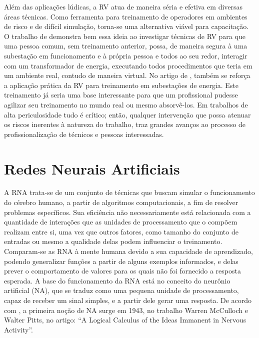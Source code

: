 Além das aplicações lúdicas, a RV atua de maneira séria e efetiva em diversas áreas técnicas. Como ferramenta para treinamento de operadores em ambientes de risco e de difícil simulação, torna-se uma alternativa viável para capacitação.  O trabalho de  demonstra bem essa ideia ao investigar técnicas de RV para que uma pessoa comum, sem treinamento anterior, possa, de maneira segura à uma subestação em funcionamento e à própria pessoa e todos ao seu redor, interagir com um transformador de energia, executando todos procedimentos que teria em um ambiente real, contudo de maneira virtual. No artigo de , também se reforça a aplicação prática da RV para treinamento em subestações de energia. Este treinamento já seria uma base interessante para que um profissional pudesse agilizar seu treinamento no mundo real ou mesmo absorvê-los. Em trabalhos de alta periculosidade tudo é crítico; então, qualquer intervenção que possa atenuar os riscos inerentes à natureza do trabalho, traz grandes avanços ao processo de profissionalização de técnicos e pessoas interessadas. 



\section{Redes Neurais Artificiais}
\label{sec:redesneurais}

A RNA trata-se de um conjunto de técnicas que buscam simular o funcionamento do cérebro humano, a partir de algoritmos computacionais, a fim de resolver problemas específicos. Sua eficiência não necessariamente está relacionada com a quantidade de interações que as unidades de processamento que o compõem realizam entre si, uma vez que outros fatores, como tamanho do conjunto de entradas ou mesmo a qualidade delas podem influenciar o treinamento. Comparam-se as RNA à mente humana devido a sua capacidade de aprendizado, podendo generalizar funções a partir de alguns exemplos informados, e delas prever o comportamento de valores para os quais não foi fornecido a resposta esperada. A base do funcionamento da RNA está no conceito do neurônio artificial (NA), que se traduz como uma pequena unidade de processamento, capaz de receber um sinal simples, e a partir dele gerar uma resposta.  De acordo com  , a primeira noção de NA surge em 1943, no trabalho Warren McCulloch e Walter Pitts, no artigo: “A Logical Calculus of the Ideas Immanent in Nervous Activity”.

